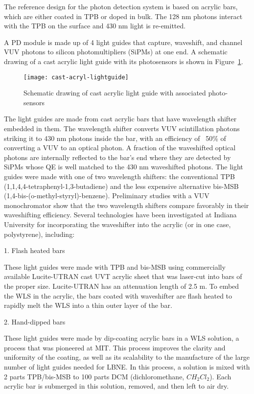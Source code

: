 The reference design for the photon detection system is based on acrylic bars, which are either coated in TPB or doped in bulk. The 128 nm photons interact with the TPB on the surface and 430 nm light is re-emitted. 

A PD module is made up of 4 light guides that capture, waveshift, and channel VUV photons to silicon photomultipliers (SiPMs) at one end.  A schematic drawing of a cast acrylic light guide with its photosensors is shown in Figure~\ref{fig:cast-acryl-lightguide}.

\begin{figure}[htbp]
\centering
\texttt{[image: cast-acryl-lightguide]}
\caption[Schematic drawing of cast acrylic light guide]{Schematic drawing of cast acrylic light guide with associated photo-sensors}
\label{fig:cast-acryl-lightguide}
\end{figure}


The light guides are made from cast acrylic bars that have wavelength shifter embedded in them.  The wavelength shifter converts VUV scintillation photons striking it to 430 nm photons inside the bar, with an efficiency of ~50\% of converting a VUV to an optical photon.  A fraction of the waveshifted optical photons are internally reflected to the bar's end where they are detected by SiPMs whose QE is well matched to the 430 nm waveshifted photons. The light guides were made with one of two wavelength shifters: the conventional TPB (1,1,4,4-tetraphenyl-1,3-butadiene) and the less expensive alternative bis-MSB (1,4-bis-(o-methyl-styryl)-benzene). Preliminary studies with a VUV monochromator show that the two wavelength shifters compare favorably in their waveshifting efficiency.  
Several technologies have been investigated at Indiana University for incorporating the waveshifter into the acrylic (or in one case, polystyrene), including:  

1.  Flash heated bars

These light guides were made with TPB and bis-MSB using commercially available Lucite-UTRAN cast UVT acrylic sheet that was laser-cut into bars of the proper size. Lucite-UTRAN has an attenuation length of 2.5 m.  To embed the WLS in the acrylic, the bars coated with waveshifter are flash heated to rapidly melt the WLS into a thin outer layer of the bar. 

2.  Hand-dipped bars

These light guides were made by dip-coating acrylic bars in a WLS solution, a process that was pioneered at MIT.  This process improves the clarity and uniformity of the coating, as well as its scalability to the manufacture of the large number of light guides needed for LBNE.  In this process, a solution is mixed with 2 parts TPB/bis-MSB to 100 parts DCM (dichloromethane, $CH_{2}Cl_{2}$).  Each acrylic bar is submerged in this solution, removed, and then left to air dry.

